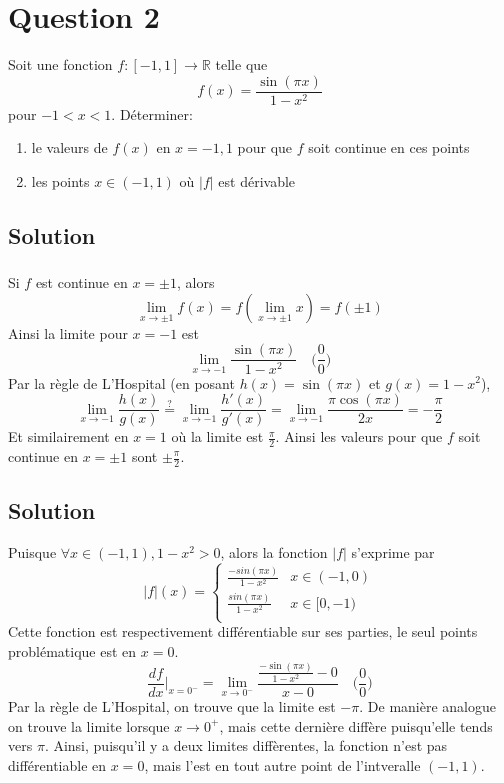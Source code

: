 \section*{Question 2}
Soit une fonction $f:[-1,1]\longrightarrow\mathbb{R}$ telle que \[f(x)=\frac{\sin(\pi x)}{1-x^2}\]
pour $-1<x<1$. Déterminer:
\begin{enumerate}[label =\alph*)]
	\item le valeurs de $f(x)$ en $x=-1,1$ pour que $f$ soit continue en ces points
	\item les points $x\in(-1,1)$ où $|f|$ est dérivable
\end{enumerate}
\subsection{Solution}
	\subsubsection*{}
		Si $f$ est continue en $x=\pm 1$, alors \[\lim_{x\to \pm 1} f(x)=f(\lim_{x\to \pm 1} x)=f(\pm 1)\]
		Ainsi la limite pour $x=-1$ est \[\lim_{x\to -1}\frac{\sin(\pi x)}{1-x^2}\quad \Big(\frac{0}{0}\Big)\]
		Par la règle de L'Hospital (en posant $h(x)=\sin(\pi x)$ et $g(x)=1-x^2$),
		\[\lim_{x\to -1} \frac{h(x)}{g(x)}\stackrel{?}{=}\lim_{x\to -1} \frac{h'(x)}{g'(x)}=\lim_{x\to -1}\frac{\pi\cos(\pi x)}{2x}=-\frac{\pi}{2}\]
		Et similairement en $x=1$ où la limite est $\frac{\pi}{2}$. Ainsi les valeurs pour que $f$ soit continue en $x=\pm 1$ sont $\pm\frac{\pi}{2}$.
	\subsection{Solution}
		Puisque $\forall x\in (-1,1), 1-x^2 >0$, alors la fonction $|f|$ s'exprime par
		\[|f|(x)=\begin{cases}
		\frac{-sin(\pi x)}{1-x^2} & x\in(-1,0)\\
		\frac{sin(\pi x)}{1-x^2} & x\in[0,-1)\\
		\end{cases}\]
		Cette fonction est respectivement différentiable sur ses parties, le seul points problématique est en $x=0$.
		\[\frac{d f}{dx}\Big\lvert_{x=0^-}=\lim_{x\to 0^-}\frac{\frac{-\sin(\pi x)}{1-x^2}-0}{x-0}\quad \Big(\frac{0}{0}\Big)\]
		Par la règle de L'Hospital, on trouve que la limite est $-\pi$. De manière analogue on trouve la limite lorsque $x\to 0^+$, mais cette dernière diffère puisqu'elle tends vers $\pi$. Ainsi, puisqu'il y a deux limites diffèrentes, la fonction n'est pas différentiable en $x=0$, mais l'est en tout autre point de l'intveralle $(-1,1)$.
		
